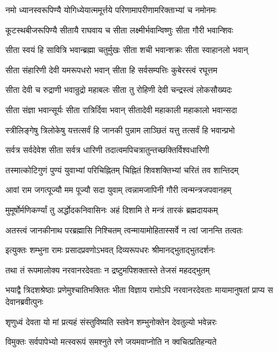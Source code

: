 \twolineshloka
{नमो ध्यानस्वरूपिण्यै योगिध्येयात्ममूर्त्तये}
{परिणामापरीणामरिक्ताभ्यां च नमोनमः}%

\twolineshloka
{कूटस्थबीजरूपिण्यै सीतायै राघवाय च}
{सीता लक्ष्मीर्भवान्विष्णुः सीता गौरी भवान्शिवः}%

\twolineshloka
{सीता स्वयं हि सावित्रि भवान्ब्रह्मा चतुर्मुखः}
{सीता शची भवान्शक्रः सीता स्वाहानलो भवान्}%

\twolineshloka
{सीता संहारिणी देवी यमरूपधरो भवान्}
{सीता हि सर्वसम्पत्तिः कुबेरस्त्वं रघूत्तम}%

\twolineshloka
{सीता देवी च रुद्राणी भवान्रुद्रो महाबलः}
{सीता तु रोहिणी देवी चन्द्रस्त्वं लोकसौख्यदः}%

\twolineshloka
{सीता संज्ञा भवान्सूर्यः सीता रात्रिर्दिवा भवान्}
{सीतादेवी महाकाली महाकालो भवान्सदा}%

\twolineshloka
{स्त्रीलिङ्गेषु त्रिलोकेषु यत्तत्सर्वं हि जानकी}
{पुन्नाम लाञ्छितं यत्तु तत्सर्वं हि भवान्प्रभो}%

\twolineshloka
{सर्वत्र सर्वदेवेश सीता सर्वत्र धारिणी}
{तदात्वमपिचत्रातुन्तच्छक्तिर्विश्वधारिणी}%

\twolineshloka
{तस्मात्कोटिगुणं पुण्यं युवाभ्यां परिचिह्नितम्}
{चिह्नितं शिवशक्तिभ्यां चरितं तव शान्तिदम्}%

\twolineshloka
{आवां राम जगत्पूज्यौ मम पूज्यौ सदा युवाम्}
{त्वन्नामजापिनी गौरी त्वन्मन्त्रजपवानहम्}%

\twolineshloka
{मुमूर्षोर्मणिकर्ण्यां तु अर्द्धोदकनिवासिनः}
{अहं दिशामि ते मन्त्रं तारकं ब्रह्मदायकम्}%

\twolineshloka
{अतस्त्वं जानकीनाथ परब्रह्मासि निश्चितम्}
{त्वन्मायामोहितास्सर्वे न त्वां जानन्ति तत्वतः}%


\twolineshloka
{इत्युक्तः शम्भुना रामः प्रसादप्रवणोऽभवत्}
{दिव्यरूपधरः श्रीमानद्भुताद्भुतदर्शनः}%

\twolineshloka
{तथा तं रूपमालोक्य नरवानरदेवताः}
{न द्रष्टुमपिशक्तास्ते तेजसं महदद्भुतम्}%


\threelineshloka
{भयाद्वै त्रिदशश्रेष्ठाः प्रणेमुश्चातिभक्तितः}
{भीता विज्ञाय रामोऽपि नरवानरदेवताः}
{मायामानुषतां प्राप्य स देवानब्रवीत्पुनः}%


\twolineshloka
{शृणुध्वं देवता यो मां प्रत्यहं संस्तुविष्यति}
{स्तवेन शम्भुनोक्तेन देवतुल्यो भवेन्नरः}%

\twolineshloka
{विमुक्तः सर्वपापेभ्यो मत्स्वरूपं समश्नुते}
{रणे जयमवाप्नोति न क्वचित्प्रतिहन्यते}%

